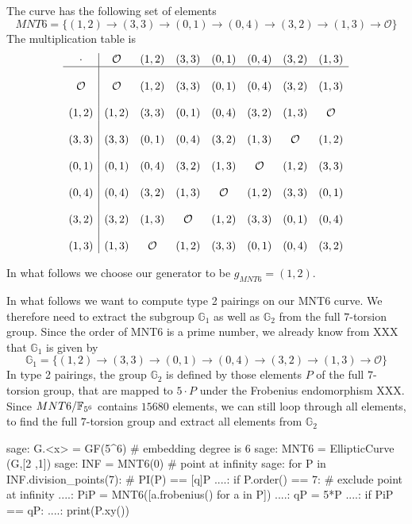 The curve has the following set of elements
$$MNT6=\{(1,2)\to (3,3)\to (0,1)\to (0,4)\to (3,2)\to (1,3)\to \mathcal{O}\}$$
The multiplication table is
\begingroup
    \fontsize{10pt}{10pt}\selectfont
$$
\begin{array}{c|ccccccc}
\cdot & \mathcal{O} & (1,2) & (3,3) & (0,1) & (0,4) & (3,2) & (1,3)\\
\hline
\\
\mathcal{O} & \mathcal{O} & (1,2) & (3,3) & (0,1) & (0,4) & (3,2) & (1,3)\\
\\
(1,2) & (1,2) & (3,3) & (0,1) & (0,4) & (3,2) & (1,3) & \mathcal{O}\\
\\
(3,3) & (3,3) & (0,1) & (0,4) & (3,2) & (1,3) & \mathcal{O} & (1,2)\\
\\
(0,1) & (0,1) & (0,4) & (3,2) & (1,3) & \mathcal{O} & (1,2) & (3,3)\\
\\
(0,4) & (0,4) & (3,2) & (1,3) & \mathcal{O} & (1,2) & (3,3) & (0,1)\\
\\
(3,2) & (3,2) & (1,3) & \mathcal{O} & (1,2) & (3,3) & (0,1) & (0,4)\\
\\
(1,3) & (1,3) & \mathcal{O} & (1,2) & (3,3) & (0,1) & (0,4) & (3,2)\\
\end{array}
$$
\endgroup

In what follows we choose our generator to be $g_{MNT6}=(1,2)$.

In what follows we want to compute type 2 pairings on our MNT6 curve. We therefore need to extract the subgroup $\mathbb{G}_1$ as well as $\mathbb{G}_2$ from the full $7$-torsion group. Since the order of MNT6 is a prime number, we already know from XXX that $\mathbb{G}_1$ is given by
$$\mathbb{G}_1=\{(1,2)\to (3,3)\to (0,1)\to (0,4)\to (3,2)\to (1,3)\to \mathcal{O}\}$$
In type 2 pairings, the group $\mathbb{G}_2$ is defined by those elements $P$ of the full $7$-torsion group, that are mapped to $5\cdot P$ under the Frobenius endomorphism XXX. Since $MNT6/\mathbb{F}_{5^6}$ contains $15680$ elements, we can still loop through all elements, to find the full $7$-torsion group and extract all elements from $\mathbb{G}_2$

\begin{sagecommandline}
sage: G.<x> = GF(5^6) # embedding degree is 6
sage: MNT6 = EllipticCurve (G,[2 ,1])
sage: INF = MNT6(0) # point at infinity
sage: for P in INF.division_points(7): # PI(P) == [q]P
....:     if P.order() == 7: # exclude point at infinity
....:         PiP = MNT6([a.frobenius() for a in P])
....:         qP = 5*P
....:         if PiP == qP:
....:             print(P.xy())
\end{sagecommandline}

